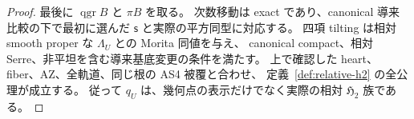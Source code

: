 \begin{proof}
最後に $\operatorname{qgr}B$ と $\pi B$ を取る。
次数移動は exact であり、canonical 導来比較の下で最初に選んだ
$\mathsf s$ と実際の平方同型に対応する。
四項 tilting は相対 smooth proper な $\Lambda_U$ との Morita 同値を与え、
canonical compact、相対 Serre、非平坦を含む導来基底変更の条件を満たす。
上で確認した heart、fiber、AZ、全軌道、同じ根の AS4 被覆と合わせ、
定義~\ref{def:relative-h2} の全公理が成立する。
従って $q_U$ は、幾何点の表示だけでなく実際の相対 $\mathfrak H_2$ 族である。
\end{proof}
